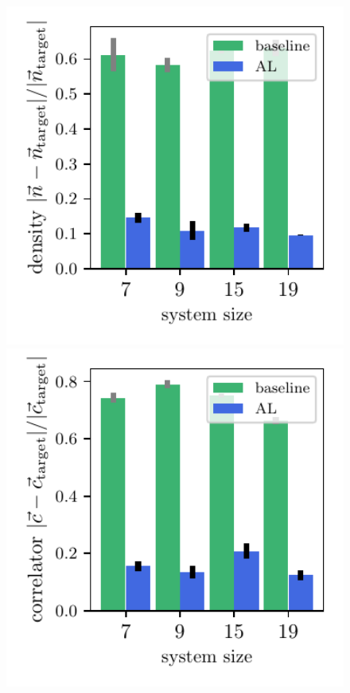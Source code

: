\documentclass[pra,aps,showpacs,groupedaddress,superscriptaddress,twocolumn,toc=flat,biblatex,footinbib]{revtex4-1}
\begin{document}

\begin{figure}[t]
	\centering
\begin{minipage}[t]{0.23\textwidth}
   \includegraphics[width=1\textwidth]{Paper/Graphics/LGT_h=1_finite_mu_density_difference.pdf}
\end{minipage}
\begin{minipage}[t]{0.23\textwidth}
   \includegraphics[width=1\textwidth]{Paper/Graphics/LGT_h=1_finite_mu_correlator_difference.pdf}

\end{minipage}
\end{figure}
\end{document}
